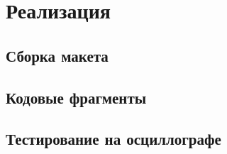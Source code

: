 \chapter{Реализация}
\section{Сборка макета}

\section{Кодовые фрагменты}

\section{Тестирование на осциллографе}